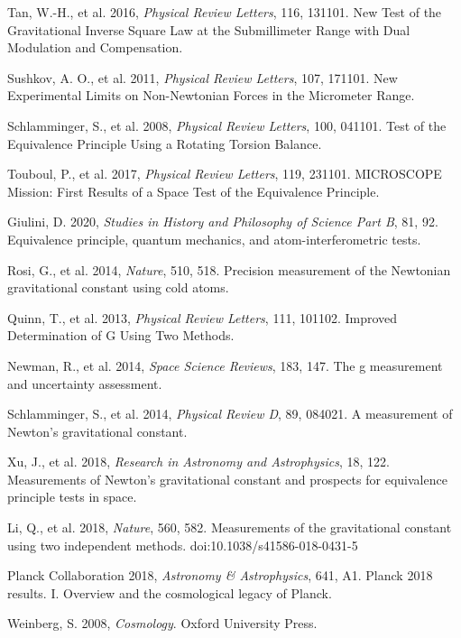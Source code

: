 \documentclass[12pt,a4paper]{article}
\begin{document}
\begin{thebibliography}{99}
 Tan, W.-H., et al. 2016, \textit{Physical Review Letters}, 116, 131101. New Test of the Gravitational Inverse Square Law at the Submillimeter Range with Dual Modulation and Compensation.

 Sushkov, A. O., et al. 2011, \textit{Physical Review Letters}, 107, 171101. New Experimental Limits on Non-Newtonian Forces in the Micrometer Range.

 Schlamminger, S., et al. 2008, \textit{Physical Review Letters}, 100, 041101. Test of the Equivalence Principle Using a Rotating Torsion Balance.

 Touboul, P., et al. 2017, \textit{Physical Review Letters}, 119, 231101. MICROSCOPE Mission: First Results of a Space Test of the Equivalence Principle.

 Giulini, D. 2020, \textit{Studies in History and Philosophy of Science Part B}, 81, 92. Equivalence principle, quantum mechanics, and atom-interferometric tests.

 Rosi, G., et al. 2014, \textit{Nature}, 510, 518. Precision measurement of the Newtonian gravitational constant using cold atoms.

 Quinn, T., et al. 2013, \textit{Physical Review Letters}, 111, 101102. Improved Determination of G Using Two Methods.

 Newman, R., et al. 2014, \textit{Space Science Reviews}, 183, 147. The g measurement and uncertainty assessment.

 Schlamminger, S., et al. 2014, \textit{Physical Review D}, 89, 084021. A measurement of Newton's gravitational constant.

 Xu, J., et al. 2018, \textit{Research in Astronomy and Astrophysics}, 18, 122. Measurements of Newton's gravitational constant and prospects for equivalence principle tests in space.

 Li, Q., et al. 2018, \textit{Nature}, 560, 582. Measurements of the gravitational constant using two independent methods. doi:10.1038/s41586-018-0431-5

 Planck Collaboration 2018, \textit{Astronomy \& Astrophysics}, 641, A1. Planck 2018 results. I. Overview and the cosmological legacy of Planck.

 Weinberg, S. 2008, \textit{Cosmology}. Oxford University Press.


\end{thebibliography}
\end{document}
